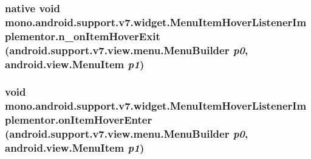 \hypertarget{classmono_1_1android_1_1support_1_1v7_1_1widget_1_1_menu_item_hover_listener_implementor_9c23f6ab665b3fade1ede25afe7652af}{
\subsubsection[{n\_\-onItemHoverExit}]{\setlength{\rightskip}{0pt plus 5cm}native void mono.android.support.v7.widget.MenuItemHoverListenerImplementor.n\_\-onItemHoverExit (android.support.v7.view.menu.MenuBuilder {\em p0}, \/  android.view.MenuItem {\em p1})}}
\label{classmono_1_1android_1_1support_1_1v7_1_1widget_1_1_menu_item_hover_listener_implementor_9c23f6ab665b3fade1ede25afe7652af}


\hypertarget{classmono_1_1android_1_1support_1_1v7_1_1widget_1_1_menu_item_hover_listener_implementor_fad93d8a57fc2c8063d02756cc5e05f3}{
\subsubsection[{onItemHoverEnter}]{\setlength{\rightskip}{0pt plus 5cm}void mono.android.support.v7.widget.MenuItemHoverListenerImplementor.onItemHoverEnter (android.support.v7.view.menu.MenuBuilder {\em p0}, \/  android.view.MenuItem {\em p1})}}
\label{classmono_1_1android_1_1support_1_1v7_1_1widget_1_1_menu_item_hover_listener_implementor_fad93d8a57fc2c8063d02756cc5e05f3}


